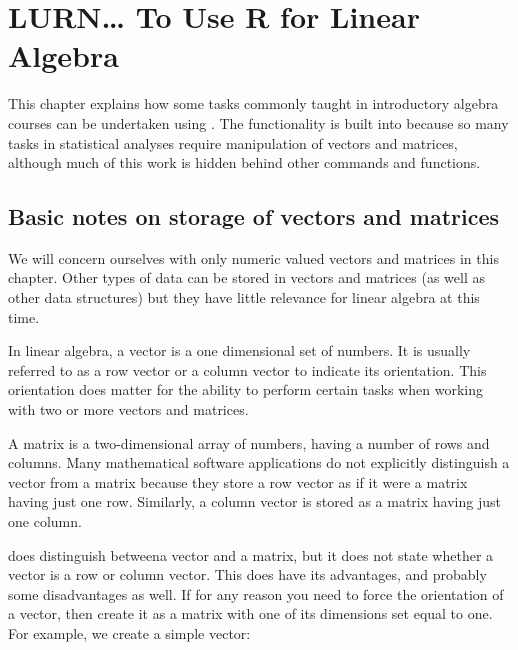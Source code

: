 



 
\chapter{LURN\ldots{} To Use R for Linear Algebra} 
\label{Algebra} 
 



 
This chapter explains how some tasks commonly taught in introductory algebra courses can be undertaken using \R{}. The functionality is built into \R{} because so many tasks in statistical analyses require manipulation of vectors and matrices, although much of this work is hidden behind other commands and functions. 
 
\section{Basic notes on storage of vectors and matrices} 
 
We will concern ourselves with only numeric valued vectors and matrices in this chapter. Other types of data can be stored in vectors and matrices (as well as other data structures) but they have little relevance for linear algebra at this time. 
 
In linear algebra, a vector is a one dimensional set of numbers. It is usually referred to as a row vector or a column vector to indicate its orientation. This orientation does matter for the ability to perform certain tasks when working with two or more vectors and matrices.  
 
A matrix is a two-dimensional array of numbers, having a number of rows and columns. Many mathematical software applications do not explicitly distinguish a vector from a matrix because they store a row vector as if it were a matrix having just one row. Similarly, a column vector is stored as a matrix having just one column. 
 
\R{} does distinguish betweena vector and a matrix, but it does not state whether a vector is a row or column vector. This does have its advantages, and probably some disadvantages as well. If for any reason you need to force the orientation of a vector, then create it as a matrix with one of its dimensions set equal to one. For example, we create a simple vector: 

